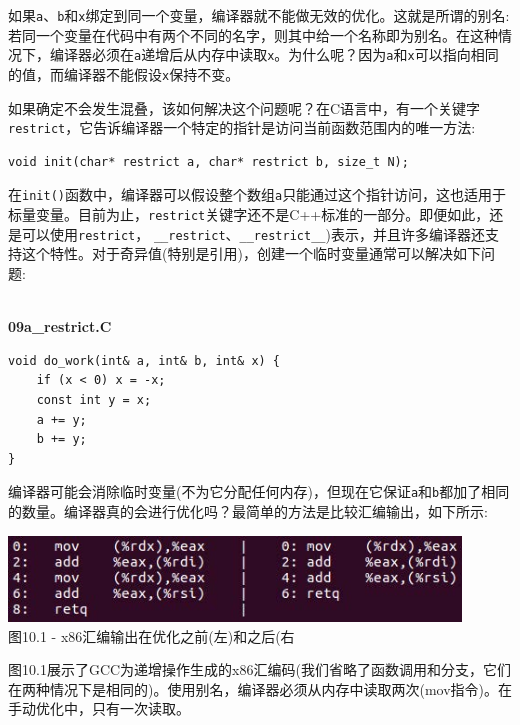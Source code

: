 如果\texttt{a}、\texttt{b}和\texttt{x}绑定到同一个变量，编译器就不能做无效的优化。这就是所谓的别名:若同一个变量在代码中有两个不同的名字，则其中给一个名称即为别名。在这种情况下，编译器必须在\texttt{a}递增后从内存中读取\texttt{x}。为什么呢？因为\texttt{a}和\texttt{x}可以指向相同的值，而编译器不能假设\texttt{x}保持不变。

如果确定不会发生混叠，该如何解决这个问题呢？在C语言中，有一个关键字\texttt{restrict}，它告诉编译器一个特定的指针是访问当前函数范围内的唯一方法:

\begin{lstlisting}[style=styleCXX]
void init(char* restrict a, char* restrict b, size_t N);
\end{lstlisting}

在\texttt{init()}函数中，编译器可以假设整个数组\texttt{a}只能通过这个指针访问，这也适用于标量变量。目前为止，\texttt{restrict}关键字还不是C++标准的一部分。即便如此，还是可以使用\texttt{restrict}， \texttt{\_\_restrict}、\texttt{\_\_restrict\_\_})表示，并且许多编译器还支持这个特性。对于奇异值(特别是引用)，创建一个临时变量通常可以解决如下问题:

\hspace*{\fill} \\ %
\noindent
\textbf{09a\_restrict.C}
\begin{lstlisting}[style=styleCXX]
void do_work(int& a, int& b, int& x) {
	if (x < 0) x = -x;
	const int y = x;
	a += y;
	b += y;
}
\end{lstlisting}

编译器可能会消除临时变量(不为它分配任何内存)，但现在它保证\texttt{a}和\texttt{b}都加了相同的数量。编译器真的会进行优化吗？最简单的方法是比较汇编输出，如下所示:

\begin{center}
\includegraphics[width=0.9\textwidth]{content/3/chapter10/images/1.jpg}\\
图10.1 - x86汇编输出在优化之前(左)和之后(右
\end{center}

图10.1展示了GCC为递增操作生成的x86汇编码(我们省略了函数调用和分支，它们在两种情况下是相同的)。使用别名，编译器必须从内存中读取两次(mov指令)。在手动优化中，只有一次读取。

